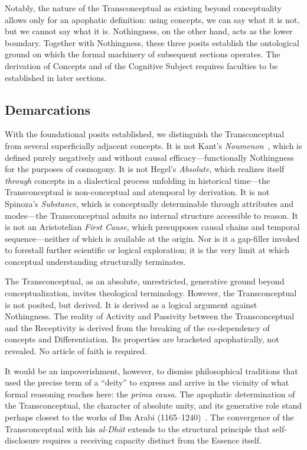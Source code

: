 Notably, the nature of the Transconceptual as existing beyond conceptuality
allows only for an apophatic definition: using concepts, we can say what it is
not, but we cannot say what it is. Nothingness, on the other hand, acts as the
lower boundary. Together with Nothingness, these three posits establish the
ontological ground on which the formal machinery of subsequent sections
operates. The derivation of Concepts and of the Cognitive Subject requires
faculties to be established in later sections.

\subsection{Demarcations}

With the foundational posits established, we distinguish the Transconceptual
from several superficially adjacent concepts. It is not Kant's
\textit{Noumenon}~\cite{Kant1781}, which is defined purely negatively and
without causal efficacy---functionally Nothingness for the purposes of
cosmogony. It is not Hegel's \textit{Absolute}, which realizes itself
\textit{through} concepts in a dialectical process unfolding in historical
time---the Transconceptual is non-conceptual and atemporal by derivation. It is
not Spinoza's \textit{Substance}, which is conceptually determinable through
attributes and modes---the Transconceptual admits no internal structure
accessible to reason. It is not an Aristotelian \textit{First Cause}, which
presupposes causal chains and temporal sequence---neither of which is available
at the origin. Nor is it a gap-filler invoked to forestall further scientific
or logical exploration; it is the very limit at which conceptual understanding
structurally terminates.

The Transconceptual, as an absolute, unrestricted, generative ground beyond
conceptualization, invites theological terminology. However, the
Transconceptual is not posited, but derived. It is derived as a logical
argument against Nothingness. The reality of Activity and Passivity between the
Transconceptual and the Receptivity is derived from the breaking of the
co-dependency of concepts and Differentiation. Its properties are bracketed
apophatically, not revealed. No article of faith is required.

It would be an impoverishment, however, to dismiss philosophical traditions
that used the precise term of a ``deity'' to express and arrive in the vicinity
of what formal reasoning reaches here: the \textit{prima causa}. The apophatic
determination of the Transconceptual, the character of absolute unity, and its
generative role stand perhaps closest to the works of Ibn Arabi
(1165--1240)~\cite{IbnArabi1203}. The convergence of the Transconceptual with
his \textit{al-Dh\=at} extends to the structural principle that self-disclosure
requires a receiving capacity distinct from the Essence itself.

